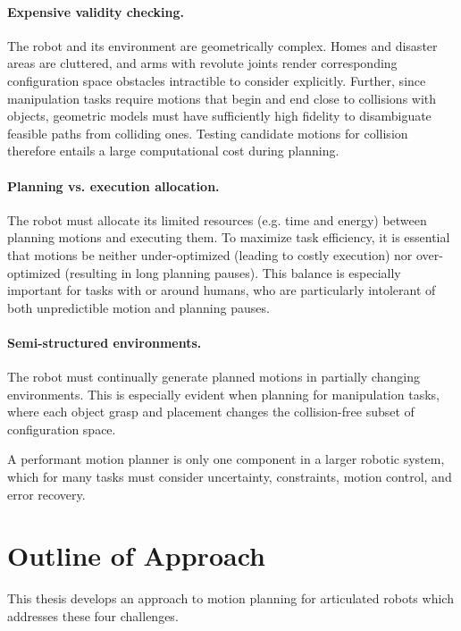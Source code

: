 \paragraph{Expensive validity checking.}
The robot and its environment are geometrically complex.
Homes and disaster areas are cluttered,
and arms with revolute joints render corresponding 
configuration space obstacles intractible to consider explicitly.
Further, since manipulation tasks require
motions that begin and end close to collisions with objects,
geometric models must have sufficiently high fidelity
to disambiguate feasible paths from colliding ones.
Testing candidate motions for collision therefore entails a
large computational cost during planning.

\paragraph{Planning vs. execution allocation.}
The robot must allocate its limited resources
(e.g. time and energy) between planning motions and executing them.
To maximize task efficiency,
it is essential that motions be neither under-optimized
(leading to costly execution)
nor over-optimized (resulting in long planning pauses).
This balance is especially important for tasks with or around
humans,
who are particularly intolerant of both unpredictible motion
and planning pauses.

\paragraph{Semi-structured environments.}
The robot must continually generate planned motions in partially
changing environments.
This is especially evident when planning for manipulation tasks,
where each object grasp and placement changes the collision-free
subset of configuration space.

A performant motion planner is only one component in a larger
robotic system,
which for many tasks must consider uncertainty, constraints,
motion control, and error recovery.

\section{Outline of Approach}

This thesis develops an approach to motion planning
for articulated robots
which addresses these four challenges.


